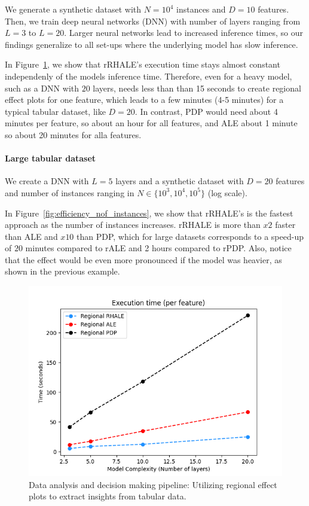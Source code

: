 \documentclass[
twocolumn,
]{ceurart}
\begin{document}
We generate a synthetic dataset with $N=10^4$ instances and $D=10$ features. Then, we train deep neural networks (DNN) with number of layers ranging from $L=3$ to $L=20$. Larger neural networks lead to increased inference times, so our findings generalize to all set-ups where the underlying model has slow inference.

In Figure~\ref{fig:efficiency_heavy_model}, we show that rRHALE's execution time stays almost constant independenly of the models inference time.
Therefore, even for a heavy model, such as a DNN with $20$ layers, needs less than than 15 seconds to create regional effect plots for one feature, which leads to a few minutes (4-5 minutes) for a typical tabular dataset, like $D=20$. In contrast, PDP would need about 4 minutes per feature, so about an hour for all features, and ALE about 1 minute so about 20 minutes for alla features.

\paragraph{Large tabular dataset}

We create a DNN with $L=5$ layers and a synthetic dataset with $D=20$ features and number of instances ranging in $N \in \{10^3, 10^4, 10^5\}$ (log scale).

In Figure~\ref{fig:efficiency_nof_instances}, we show that rRHALE's is the fastest approach as the number of instances increases. rRHALE is more than $x2$ faster than ALE and $x10$ than PDP, which for large datasets corresponds to a speed-up of $20$ minutes compared to rALE and 2 hours compared to rPDP. Also, notice that the effect would be even more pronounced if the model was heavier, as shown in the previous example.

\begin{figure}
    \centering
    \includegraphics[width=.49\textwidth]{figures/simulation_2/efficiency_layers.png}
    \caption{Data analysis and decision making pipeline: Utilizing regional effect plots to extract insights from tabular data.}
    \label{fig:efficiency_heavy_model}
\end{figure}
\end{document}
